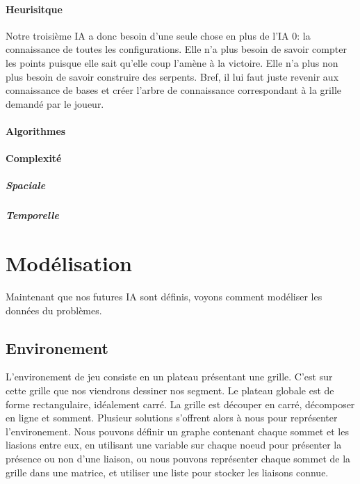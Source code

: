 \documentclass[a4paper,12pt]{report}
\begin{document}
\subsection{Heurisitque}

Notre troisi\`eme IA a donc besoin d'une seule chose en plus de l'IA 0: la connaissance de toutes les configurations. Elle n'a plus besoin de savoir compter les points puisque elle sait qu'elle coup l'am\`ene \`a la victoire. Elle n'a plus non plus besoin de savoir construire des serpents. Bref, il lui faut juste revenir aux connaissance de bases et cr\'eer l'arbre de connaissance correspondant \`a la grille demand\'e par le joueur.

\subsection{Algorithmes}

\subsection{Complexit\'e}

\subsubsection{Spaciale}

\subsubsection{Temporelle}

\part{Mod\'elisation}

Maintenant que nos futures IA sont d\'efinis, voyons comment mod\'eliser les donn\'ees du probl\`emes.

\chapter{Environement}

L'environement de jeu consiste en un plateau pr\'esentant une grille. C'est sur cette grille que nos viendrons dessiner nos segment. Le plateau globale est de forme rectangulaire, id\'ealement carr\'e. La grille est d\'ecouper en carr\'e, d\'ecomposer en ligne et somment. Plusieur solutions s'offrent alors \`a nous pour repr\'esenter l'environement. Nous pouvons d\'efinir un graphe contenant chaque sommet et les liasions entre eux, en utilisant une variable sur chaque noeud pour pr\'esenter la pr\'esence ou non d'une liaison, ou nous pouvons repr\'esenter chaque sommet de la grille dans une matrice, et utiliser une liste pour stocker les liaisons connue. \\
\end{document}
